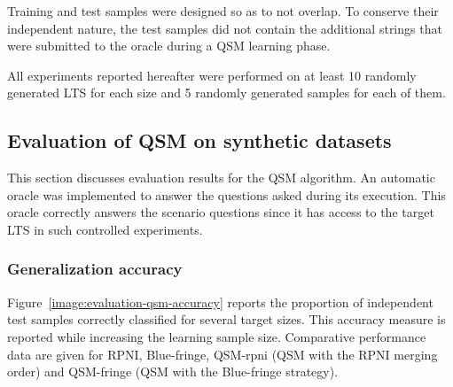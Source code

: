 Training and test samples were designed so as to not overlap. To conserve their independent nature, the test samples did not contain the additional strings that were submitted to the oracle during a QSM learning phase.

All experiments reported hereafter were performed on at least 10 randomly generated LTS for each size and 5 randomly generated samples for each of them.

\subsection{Evaluation of QSM on synthetic datasets\label{subsection:evaluation-synthetic-qsm}}

This section discusses evaluation results for the QSM algorithm. An automatic oracle was implemented to answer the questions asked during its execution. This oracle correctly answers the scenario questions since it has access to the target LTS in such controlled experiments.

\subsubsection*{Generalization accuracy}

Figure~\ref{image:evaluation-qsm-accuracy} reports the proportion of independent test samples correctly classified for several target sizes. This accuracy measure is reported while increasing the learning sample size. Comparative performance data are given for RPNI, Blue-fringe, QSM-rpni (QSM with the RPNI merging order) and QSM-fringe (QSM with the Blue-fringe strategy).

